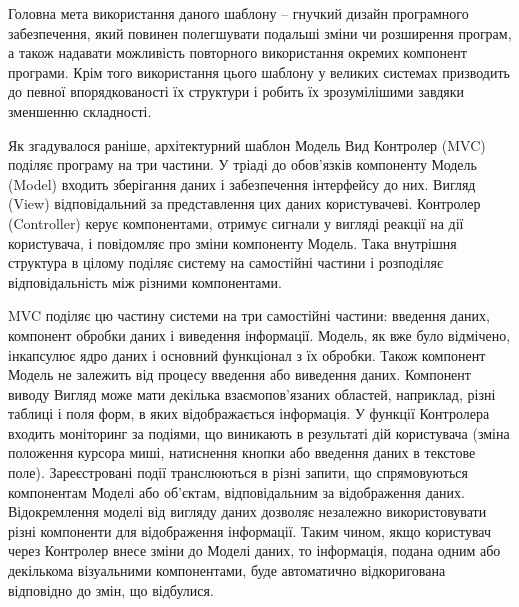 \par Головна мета використання даного шаблону -- гнучкий дизайн програмного забезпечення, який повинен полегшувати подальші зміни чи розширення програм, а також надавати можливість повторного використання окремих компонент програми. 
Крім того використання цього шаблону у великих системах призводить до певної впорядкованості їх структури і робить їх зрозумілішими завдяки зменшенню складності.

\par Як згадувалося раніше, архітектурний шаблон Модель Вид Контролер (MVC) поділяє програму на три частини. У тріаді до обов'язків компоненту Модель (Model) входить зберігання даних і забезпечення інтерфейсу до них. Вигляд (View) відповідальний за представлення цих даних користувачеві. Контролер (Controller) керує компонентами, отримує сигнали у вигляді реакції на дії користувача, і повідомляє про зміни компоненту Модель. Така внутрішня структура в цілому поділяє систему на самостійні частини і розподіляє відповідальність між різними компонентами.
\par MVC поділяє цю частину системи на три самостійні частини: введення даних, компонент обробки даних і виведення інформації. Модель, як вже було відмічено, інкапсулює ядро даних і основний функціонал з їх обробки. Також компонент Модель не залежить від процесу введення або виведення даних. Компонент виводу Вигляд може мати декілька взаємопов'язаних областей, наприклад, різні таблиці і поля форм, в яких відображається інформація. У функції Контролера входить моніторинг за подіями, що виникають в результаті дій користувача (зміна положення курсора миші, натиснення кнопки або введення даних в текстове поле).
Зареєстровані події транслюються в різні запити, що спрямовуються компонентам Моделі або об'єктам, відповідальним за відображення даних. Відокремлення моделі від вигляду даних дозволяє незалежно використовувати різні компоненти для відображення інформації. Таким чином, якщо користувач через Контролер внесе зміни до Моделі даних, то інформація, подана одним або декількома візуальними компонентами, буде автоматично відкоригована відповідно до змін, що відбулися.


